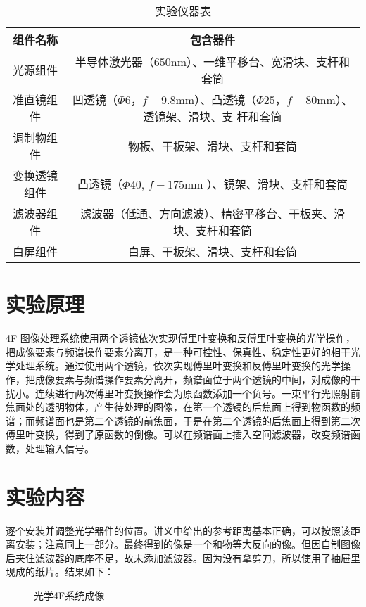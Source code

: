 \documentclass[11pt]{article}
\begin{document}
\begin{table}[H]
    \centering
    \begin{tabular}{|c|c|}\hline
        组件名称 & 包含器件\\ \hline
        光源组件& 半导体激光器（$650$nm）、一维平移台、宽滑块、支杆和套筒\\ \hline
        准直镜组件& 凹透镜（$\Phi 6$，$f-9.8$mm）、凸透镜（$\Phi 25$，$f-80$mm）、透镜架、滑块、支
        杆和套筒\\ \hline
        调制物组件& 物板、干板架、滑块、支杆和套筒\\ \hline
        变换透镜组件& 凸透镜（$\Phi 40$, $f-175$mm ）、镜架、滑块、支杆和套筒\\ \hline
        滤波器组件& 滤波器（低通、方向滤波）、精密平移台、干板夹、滑块、支杆和套筒\\ \hline
        白屏组件& 白屏、干板架、滑块、支杆和套筒\\ \hline
    \end{tabular}
    \caption{实验仪器表}
\end{table}

\section{实验原理}

4F 图像处理系统使用两个透镜依次实现傅里叶变换和反傅里叶变换的光学操作，把成像要素与频谱操作要素分离开，是一种可控性、保真性、稳定性更好的相干光学处理系统。通过使用两个透镜，依次实现傅里叶变换和反傅里叶变换的光学操作，把成像要素与频谱操作要素分离开，频谱面位于两个透镜的中间，对成像的干扰小。连续进行两次傅里叶变换操作会为原函数添加一个负号。一束平行光照射前焦面处的透明物体，产生待处理的图像，在第一个透镜的后焦面上得到物函数的频谱；而频谱面也是第二个透镜的前焦面，于是在第二个透镜的后焦面上得到第二次傅里叶变换，得到了原函数的倒像。可以在频谱面上插入空间滤波器，改变频谱函数，处理输入信号。

\section{实验内容}

逐个安装并调整光学器件的位置。讲义中给出的参考距离基本正确，可以按照该距离安装；注意同上一部分。最终得到的像是一个和物等大反向的像。但因自制图像后夹住滤波器的底座不足，故未添加滤波器。因为没有拿剪刀，所以使用了抽屉里现成的纸片。结果如下：

\begin{figure}[H]
    \centering
    \caption{光学4F系统成像}
\end{figure}
\end{document}
